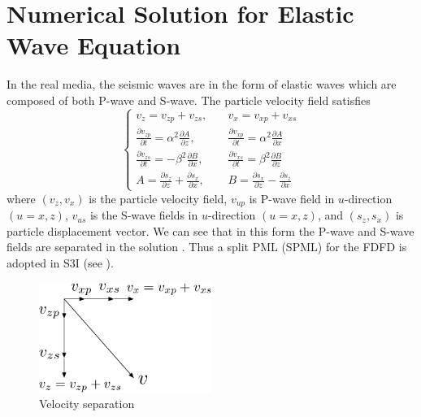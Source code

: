 \documentclass[11pt,titlepage]{article}
\theoremstyle{plain}
\theoremstyle{definition}
\theoremstyle{remark}
\numberwithin{equation}{section}
\begin{document}
\section{Numerical Solution for Elastic Wave Equation}
In the real media, the seismic waves are in the form of elastic waves which are composed of both P-wave and S-wave. The particle velocity field satisfies 
\begin{equation}
    \left\{
    \begin{aligned}
    v_z=v_{zp}+v_{zs}, \quad &v_x=v_{xp}+v_{xs}\\
    \frac{\partial v_{zp}}{\partial t}=\alpha^2 \frac{\partial A}{\partial z}, \quad &\frac{\partial v_{xp}}{\partial t}=\alpha^2 \frac{\partial A}{\partial x}\\
    \frac{\partial v_{zs}}{\partial t}=-\beta^2 \frac{\partial B}{\partial x}, \quad &\frac{\partial v_{xs}}{\partial t}=\beta^2 \frac{\partial B}{\partial z}\\
    A=\frac{\partial s_z}{\partial z}+\frac{\partial s_x}{\partial x}, \quad &B=\frac{\partial s_x}{\partial z}-\frac{\partial s_z}{\partial x}
    \end{aligned}
    \right.
    \end{equation}
  where $(v_z, v_x)$ is the particle velocity field, $v_{up}$ is P-wave field in $u$-direction $(u=x, z)$,
  $v_{us}$ is the S-wave fields in $u$-direction $(u=x, z)$, and $(s_z, s_x)$ is particle displacement vector.
  We can see that in this form the P-wave and S-wave fields are separated in the solution \cite{Chen:2014aa}. Thus a split PML (SPML) for the FDFD is adopted in S3I (see ).
    
\begin{figure}[htbp]
\centering
\includegraphics[width=0.5\textwidth]{Fig/EWCoordinates.pdf}
\caption{Velocity separation}
\end{figure}
\end{document}
